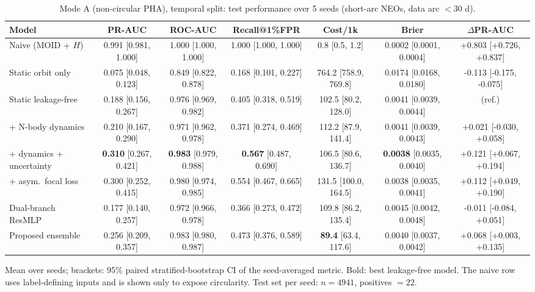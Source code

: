 \begin{table}[t]
\centering
\small
\caption{Mode A (non-circular PHA), temporal split: test performance over 5 seeds (short-arc NEOs, data arc $<30$ d).}
\label{tab:pha_temporal_short_arc}
\begin{tabular}{lcccccc}
\toprule
Model & PR-AUC & ROC-AUC & Recall@1\%FPR & Cost/1k & Brier & $\Delta$PR-AUC \\
\midrule
Naive (MOID + $H$) & 0.991 \scriptsize{[0.981, 1.000]} & 1.000 \scriptsize{[1.000, 1.000]} & 1.000 \scriptsize{[1.000, 1.000]} & 0.8 \scriptsize{[0.5, 1.2]} & 0.0002 \scriptsize{[0.0001, 0.0004]} & +0.803 \scriptsize{[+0.726, +0.837]} \\
\midrule
Static orbit only & 0.075 \scriptsize{[0.048, 0.123]} & 0.849 \scriptsize{[0.822, 0.878]} & 0.168 \scriptsize{[0.101, 0.227]} & 764.2 \scriptsize{[758.9, 769.8]} & 0.0174 \scriptsize{[0.0168, 0.0180]} & -0.113 \scriptsize{[-0.175, -0.075]} \\
Static leakage-free & 0.188 \scriptsize{[0.156, 0.267]} & 0.976 \scriptsize{[0.969, 0.982]} & 0.405 \scriptsize{[0.318, 0.519]} & 102.5 \scriptsize{[80.2, 128.0]} & 0.0041 \scriptsize{[0.0039, 0.0044]} & (ref.) \\
+ N-body dynamics & 0.210 \scriptsize{[0.167, 0.290]} & 0.971 \scriptsize{[0.962, 0.978]} & 0.371 \scriptsize{[0.274, 0.469]} & 112.2 \scriptsize{[87.9, 141.4]} & 0.0041 \scriptsize{[0.0039, 0.0043]} & +0.021 \scriptsize{[-0.030, +0.058]} \\
+ dynamics + uncertainty & \textbf{0.310} \scriptsize{[0.267, 0.421]} & \textbf{0.983} \scriptsize{[0.979, 0.988]} & \textbf{0.567} \scriptsize{[0.487, 0.690]} & 106.5 \scriptsize{[80.6, 136.7]} & \textbf{0.0038} \scriptsize{[0.0035, 0.0040]} & +0.121 \scriptsize{[+0.067, +0.194]} \\
+ asym.\ focal loss & 0.300 \scriptsize{[0.252, 0.415]} & 0.980 \scriptsize{[0.974, 0.985]} & 0.554 \scriptsize{[0.467, 0.665]} & 131.5 \scriptsize{[100.0, 164.5]} & 0.0038 \scriptsize{[0.0035, 0.0041]} & +0.112 \scriptsize{[+0.049, +0.190]} \\
Dual-branch ResMLP & 0.177 \scriptsize{[0.140, 0.257]} & 0.972 \scriptsize{[0.966, 0.978]} & 0.366 \scriptsize{[0.273, 0.472]} & 109.8 \scriptsize{[86.2, 135.4]} & 0.0045 \scriptsize{[0.0042, 0.0048]} & -0.011 \scriptsize{[-0.084, +0.051]} \\
Proposed ensemble & 0.256 \scriptsize{[0.209, 0.357]} & 0.983 \scriptsize{[0.980, 0.987]} & 0.473 \scriptsize{[0.376, 0.589]} & \textbf{89.4} \scriptsize{[63.4, 117.6]} & 0.0040 \scriptsize{[0.0037, 0.0042]} & +0.068 \scriptsize{[+0.003, +0.135]} \\
\bottomrule
\end{tabular}
\par\vspace{2pt}\footnotesize Mean over seeds; brackets: 95\% paired stratified-bootstrap CI of the seed-averaged metric. Bold: best leakage-free model. The naive row uses label-defining inputs and is shown only to expose circularity. Test set per seed: $n=4941$, positives $=22$.
\end{table}
